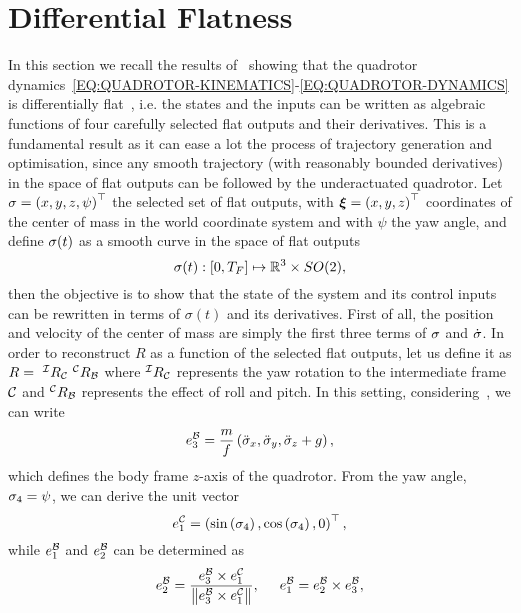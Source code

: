 \section{Differential Flatness}%
\label{SEC:DIFFERENTIAL-FLATNESS}
In this section we recall the results of~\cite{mellinger2011minimum} showing that the quadrotor dynamics~\eqref{EQ:QUADROTOR-KINEMATICS}-\eqref{EQ:QUADROTOR-DYNAMICS}
is differentially flat~\cite{van1998real}, i.e. the states and the inputs can be written as algebraic functions of four carefully selected
flat outputs and their derivatives. This is a fundamental result as it can ease a lot the process of trajectory generation and 
optimisation, since any smooth trajectory (with reasonably bounded derivatives) in the space of flat outputs can be followed by
the underactuated quadrotor. Let $\sigma = \left( x, y, z, \psi \right)^{\top}$ the selected set of flat outputs, with
$\boldsymbol{\xi} = \left( x, y, z \right)^{\top}$ coordinates of the center of mass in the world coordinate system and with $\psi$ the yaw angle,
and define $\sigma(t)$ as a smooth curve in the space of flat outputs
\begin{equation*}
    \sigma(t) : \left[ 0, T_F \right] \mapsto \mathbb{R}^3 \times SO(2),
\end{equation*}
then the objective is to show that the state of the system and its control inputs can be rewritten in terms of $\sigma(t)$ and its derivatives.
First of all, the position and velocity of the center of mass are simply the first three terms of $\sigma$ and $\dot{\sigma}$.
In order to reconstruct $R$ as a function of the selected flat outputs, let us define it as $R =\ ^{\mathcal{I}}R_{\mathcal{C}}\ ^{\mathcal{C}}R_{\mathcal{B}}$
where $^{\mathcal{I}}R_{\mathcal{C}}$ represents the yaw rotation to the intermediate frame $\mathcal{C}$ and $^{\mathcal{C}}R_{\mathcal{B}}$ represents the effect of roll and pitch.
In this setting, considering~, we can write
\begin{equation}%
    \label{EQ:FLAT-THRUST}
    e_3^{\BB} = \frac{m}{f} \lp \ddot{\flatoutput}_x, \ddot{\flatoutput}_y, \ddot{\flatoutput}_z + g \rp,
\end{equation}
which defines the body frame $z$-axis of the quadrotor.
From the yaw angle, $\sigma_4 = \psi$, we can derive the unit vector
\begin{equation*}
    e_1^{\mathcal{C}} = \left( \sin\left( \sigma_4 \right), \cos\left( \sigma_4 \right), 0 \right)^{\top},
\end{equation*}
while $e_1^{\mathcal{B}}$ and $e_2^{\mathcal{B}}$ can be determined as
\begin{equation*}
    e_2^{\mathcal{B}} = \frac{e_3^{\mathcal{B}} \times e_1^{\mathcal{C}}}{\left \lVert {e_3^{\mathcal{B}} \times e_1^{\mathcal{C}}} \right \rVert}, \hspace{0.5cm} e_1^{\mathcal{B}} = e_2^{\mathcal{B}} \times e_3^{\mathcal{B}},
\end{equation*}
